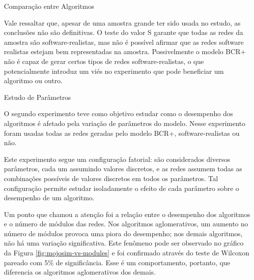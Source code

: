 \begin{section}{Comparação entre Algoritmos}

Vale ressaltar que, apesar de uma amostra grande ter sido usada no estudo, as conclusões não são definitivas. O teste do valor S garante que todas as redes da amostra são software-realistas, mas não é possível afirmar que as redes software realistas estejam bem representadas na amostra. Possivelmente o modelo BCR+ não é capaz de gerar certos tipos de redes software-realistas, o que potencialmente introduz um viés no experimento que pode beneficiar um algoritmo ou outro.


\end{section}

\begin{section}{Estudo de Parâmetros}

O segundo experimento teve como objetivo estudar como o desempenho dos algoritmos é afetado pela variação de parâmetros do modelo. Nesse experimento foram usadas todas as redes geradas pelo modelo BCR+, software-realistas ou não.

Este experimento segue um configuração fatorial: são considerados diversos parâmetros, cada um assumindo valores discretos, e as redes assumem todas as combinações possíveis de valores discretos em todos os parâmetros. Tal configuração permite estudar isoladamente o efeito de cada parâmetro sobre o desempenho de um algoritmo.


Um ponto que chamou a atenção foi a relação entre o desempenho dos algoritmos e o número de módulos das redes. Nos algoritmos aglomerativos, um aumento no número de módulos provoca uma piora do desempenho; nos demais algoritmos, não há uma variação significativa. Este fenômeno pode ser observado no gráfico da Figura \ref{fig:mojosim-vs-modules} e foi confirmado através do teste de Wilcoxon pareado com 5\% de significância. Esse é um comportamento, portanto, que diferencia os algoritmos aglomerativos dos demais. 


\end{section}
